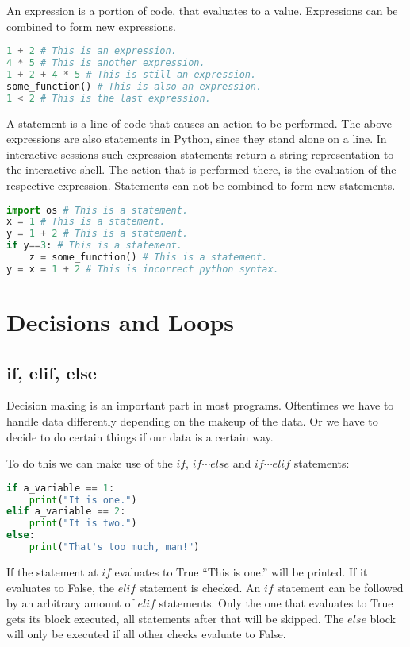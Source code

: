 \documentclass{article}
\begin{document}
An expression is a portion of code, that evaluates to a value.
Expressions can be combined to form new expressions.
\begin{lstlisting}[language=Python]
1 + 2 # This is an expression.
4 * 5 # This is another expression.
1 + 2 + 4 * 5 # This is still an expression.
some_function() # This is also an expression.
1 < 2 # This is the last expression.
\end{lstlisting}

A statement is a line of code that causes an action to be performed.
The above expressions are also statements in Python, since they stand alone on a line.
In interactive sessions such expression statements return a string representation to the interactive shell.
The action that is performed there, is the evaluation of the respective expression.
Statements can not be combined to form new statements.

\begin{lstlisting}[language=Python]
import os # This is a statement.
x = 1 # This is a statement.
y = 1 + 2 # This is a statement.
if y==3: # This is a statement.
    z = some_function() # This is a statement. 
y = x = 1 + 2 # This is incorrect python syntax.
\end{lstlisting}


\section{Decisions and Loops}

\subsection{if, elif, else}

Decision making is an important part in most programs.
Oftentimes we have to handle data differently depending on
the makeup of the data.
Or we have to decide to do certain things if our data is a certain way.

To do this we can make use of the $if$, $if\cdots else$ and $if\cdots elif$
statements:

\begin{lstlisting}[language=Python]
if a_variable == 1:
    print("It is one.")
elif a_variable == 2:
    print("It is two.")
else:
    print("That's too much, man!")
\end{lstlisting}

If the statement at $if$ evaluates to True ``This is one.'' will be printed.
If it evaluates to False, the $elif$ statement is checked.
An $if$ statement can be followed by an arbitrary amount of $elif$ statements.
Only the one that evaluates to True gets its block executed, all statements
after that will be skipped.
The $else$ block will only be executed if all other checks evaluate to False.
\end{document}
